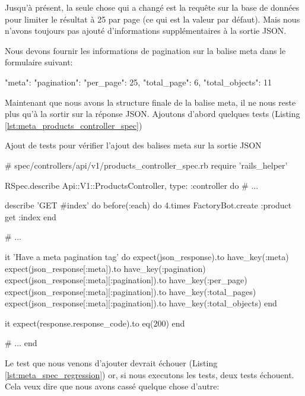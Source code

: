 \documentclass[]{report}
\begin{document}
      Jusqu'à présent, la seule chose qui a changé est la requête sur la base de données pour limiter le résultat à 25 par page (ce qui est la valeur par défaut). Mais nous n'avons toujours pas ajouté d'informations supplémentaires à la sortie JSON.

      Nous devons fournir les informations de pagination sur la balise meta dans le formulaire suivant:

      \begin{jsoncode}
      "meta": {
          "pagination": {
              "per_page": 25,
              "total_page": 6,
              "total_objects": 11
          }
      }
      \end{jsoncode}

      Maintenant que nous avons la structure finale de la balise meta, il ne nous reste plus qu'à la sortir sur la réponse JSON. Ajoutons d'abord quelques tests (Listing \ref{lst:meta_products_controller_spec})

      \begin{listing}
        \caption{Ajout de tests pour vérifier l'ajout des balises meta sur la sortie JSON}
        \label{lst:meta_products_controller_spec}
        \begin{rubycode}
        # spec/controllers/api/v1/products_controller_spec.rb
        require 'rails_helper'

        RSpec.describe Api::V1::ProductsController, type: :controller do
          # ...

          describe 'GET #index' do
            before(:each) do
              4.times { FactoryBot.create :product }
              get :index
            end

            # ...

            it 'Have a meta pagination tag' do
              expect(json_response).to have_key(:meta)
              expect(json_response[:meta]).to have_key(:pagination)
              expect(json_response[:meta][:pagination]).to have_key(:per_page)
              expect(json_response[:meta][:pagination]).to have_key(:total_pages)
              expect(json_response[:meta][:pagination]).to have_key(:total_objects)
            end

            it { expect(response.response_code).to eq(200) }
          end

          # ...
        end
        \end{rubycode}
      \end{listing}

      Le test que nous venons d'ajouter devrait échouer (Listing \ref{lst:meta_spec_regression}) or, si nous executons les tests, deux tests échouent. Cela veux dire que nous avons cassé quelque chose d'autre:
\end{document}
